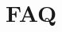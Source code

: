 ﻿\section{FAQ}
\label{sec:faq}

\begin{comment} 

Erro de quando se abre um modelo sem ter executado a transformacao antes. Os
 ficheiros ainda n tao carregados na plataforma\ldots
 
 Solucao: adicionar atributo no modelo (nao viavel). Outra: Correr simplesmente
 a transformacao

Erro de inicializacao de prolog e isso
	Solucao: rever as path variables e copiar o jpl.jar pra lib do java. Verificar
	tbm se a versao usada do java eh a correcta.





\end{comment}

% 
